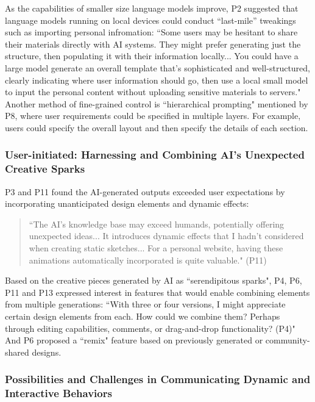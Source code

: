 As the capabilities of smaller size language models improve, P2 suggested that language models running on local devices could conduct ``last-mile'' tweakings such as importing personal infromation: ``Some users may be hesitant to share their materials directly with AI systems. They might prefer generating just the structure, then populating it with their information locally... You could have a large model generate an overall template that's sophisticated and well-structured, clearly indicating where user information should go, then use a local small model to input the personal content without uploading sensitive materials to servers." Another method of fine-grained control is ``hierarchical prompting" mentioned by P8, where user requirements could be specified in multiple layers. For example, users could specify the overall layout and then specify the details of each section.

\subsubsection{User-initiated: Harnessing and Combining AI's Unexpected Creative Sparks}
P3 and P11 found the AI-generated outputs exceeded user expectations by incorporating unanticipated design elements and dynamic effects:

\begin{quote}
``The AI's knowledge base may exceed humands, potentially offering unexpected ideas... It introduces dynamic effects that I hadn't considered when creating static sketches... For a personal website, having these animations automatically incorporated is quite valuable." (P11)
\end{quote}

Based on the creative pieces generated by AI as ``serendipitous sparks", P4, P6, P11 and P13 expressed interest in features that would enable combining elements from multiple generations: ``With three or four versions, I might appreciate certain design elements from each. How could we combine them? Perhaps through editing capabilities, comments, or drag-and-drop functionality? (P4)" And P6 proposed a ``remix" feature based on previously generated or community-shared designs.

\subsubsection{Possibilities and Challenges in Communicating Dynamic and Interactive Behaviors}

